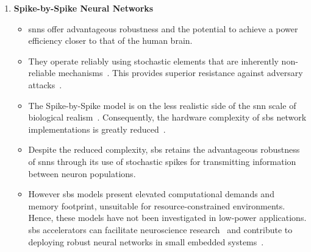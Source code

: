 \begin{enumerate}[label={\textbf{S\arabic*}}]
	
	\item \textbf{Spike-by-Spike Neural Networks}
	\begin{itemize}
		\item \glspl{snn} offer advantageous robustness and the potential to achieve a power efficiency closer to that of the human brain. 
		\item They operate reliably using stochastic elements that are inherently non-reliable mechanisms~\cite{mcdonnell2011benefits}. This provides superior resistance against adversary attacks~\cite{ernst2007efficient, Dapello2020.06.16.154542}.
		\item The Spike-by-Spike model is on the less realistic side of the \gls{snn} scale of biological realism~\cite{rotermund2019Backpropagation,ernst2007efficient}. Consequently, the hardware complexity of \gls{sbs} network implementations is greatly reduced~\cite{rotermund2018massively}.
		\item Despite the reduced complexity, \gls{sbs} retains the advantageous robustness of \glspl{snn} through its use of stochastic spikes for transmitting information between neuron populations.
		\item However \gls{sbs} models present elevated computational demands and memory footprint, unsuitable for resource-constrained environments. Hence, these models have not been investigated in low-power applications. \gls{sbs} accelerators can facilitate neuroscience research~\cite{ernst2007efficient,rotermund2019recurrentsbs, dayan2001theoretical} and contribute to deploying robust neural networks in small embedded systems~\cite{nevarez2020accelerator}.
	\end{itemize}
	

\end{enumerate}

